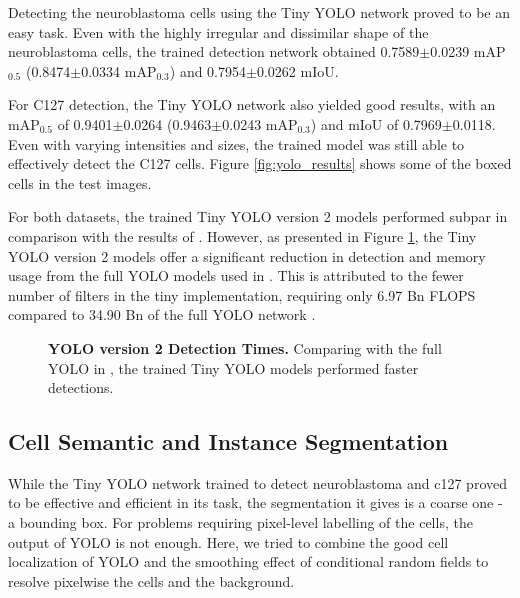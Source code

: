 \documentclass[10pt, journal, compsoc]{IEEEtran}
\begin{document}
Detecting the neuroblastoma cells using the Tiny YOLO network proved to be an easy task. Even with the highly irregular and dissimilar shape of the neuroblastoma cells, the trained detection network obtained 0.7589$\pm$0.0239 mAP$_{0.5}$ (0.8474$\pm$0.0334 mAP$_{0.3}$) and 0.7954$\pm$0.0262 mIoU.

For C127 detection, the Tiny YOLO network also yielded good results, with an mAP$_{0.5}$ of 0.9401$\pm$0.0264 (0.9463$\pm$0.0243 mAP$_{0.3}$) and mIoU of 0.7969$\pm$0.0118. Even with varying intensities and sizes, the trained model was still able to effectively detect the C127 cells. Figure \ref{fig:yolo_results} shows some of the boxed  cells in the test images.

For both datasets, the trained Tiny YOLO version 2 models performed subpar in comparison with the results of \cite{Waithe544833}. However, as presented in Figure \ref{fig:yolo_runtimes}, the Tiny YOLO version 2 models offer a significant reduction in detection and memory usage from the full YOLO models used in \cite{Waithe544833}. This is attributed to the fewer number of filters in the tiny implementation, requiring only 6.97 Bn FLOPS compared to 34.90 Bn of the full YOLO network \cite{redmon2016yolo9000}.
\begin{figure}

\caption{\textbf{YOLO version 2 Detection Times.} Comparing with the full YOLO in \cite{Waithe544833}, the trained Tiny YOLO models performed faster detections.}
\label{fig:yolo_runtimes}
\end{figure} 
\subsection{Cell Semantic and Instance Segmentation}
While the Tiny YOLO network trained to detect neuroblastoma and c127 proved to be effective and efficient in its task, the segmentation it gives is a coarse one - a bounding box. For problems requiring pixel-level labelling of the cells, the output of YOLO is not enough. Here, we tried to combine the good cell localization of YOLO and the smoothing effect of conditional random fields to resolve pixelwise the cells and the background.
\end{document}
